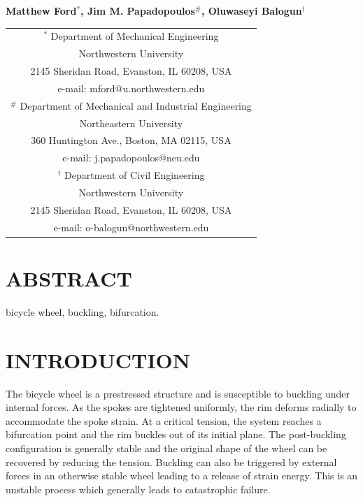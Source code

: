 \documentclass{bmd2016p}
\begin{document}
\begin{center}
\end{center}

\begin{center}
\normalsize{\bf{Matthew Ford$^{*}$, Jim M. Papadopoulos$^\#$, 
            Oluwaseyi Balogun$^\dag$}}
\end{center} 

\begin{center}
\begin{tabular}{c}
$^*$ Department of Mechanical Engineering\\
Northwestern University\\
2145 Sheridan Road, Evanston, IL 60208, USA\\
e-mail: mford@u.northwestern.edu\\[2.5ex]

$^\#$ Department of Mechanical and Industrial Engineering\\
Northeastern University\\
360 Huntington Ave., Boston, MA 02115, USA\\
e-mail: j.papadopoulos@neu.edu\\[2.5ex]

$^\dag$ Department of Civil Engineering\\
Northwestern University\\
2145 Sheridan Road, Evanston, IL 60208, USA\\
e-mail: o-balogun@northwestern.edu\\
\end{tabular}
\end{center}

\section*{ABSTRACT}


\begin{keywords}
bicycle wheel, 
buckling, 
bifurcation.
\end{keywords}





\section{INTRODUCTION}

The bicycle wheel is a prestressed structure and is susceptible to buckling under internal forces. As the spokes are tightened uniformly, the rim deforms radially to accommodate the spoke strain. At a critical tension, the system reaches a bifurcation point and the rim buckles out of its initial plane. The post-buckling configuration is generally stable and the original shape of the wheel can be recovered by reducing the tension. Buckling can also be triggered by external forces in an otherwise stable wheel leading to a release of strain energy. This is an unstable process which generally leads to catastrophic failure.
\end{document}
